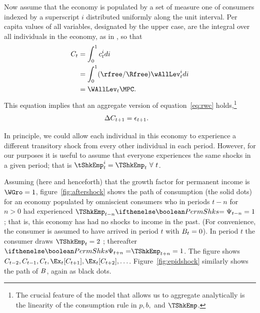 \documentclass{handout}
\begin{document}
Now assume that the economy is populated by a set of measure one of
consumers indexed by a superscript $i$ distributed uniformly along the unit
interval.  Per capita values of all variables, designated by the upper
case, are the integral over all individuals in the economy, 
as in \Aggregation, so that 
\begin{equation}\begin{gathered}\begin{aligned}
        \CLev_{t}  & =  \int_{0}^{1} \cLev_{t}^{i} di
\\       & =  \int_{0}^{1} (\rfree/\Rfree)  \wAllLev_{t}^{i} di
\\   & =  \WAllLev_{t} \MPC
.
\end{aligned}\end{gathered}\end{equation}
This equation implies that an aggregate version of equation~\eqref{eq:rwc} holds,\footnote{The crucial feature of the model that allows us to aggregate 
analytically is the linearity of the consumption rule in $p, b, $ and 
$\TShkEmp$.}
  \begin{equation}\begin{gathered}\begin{aligned}
    \Delta C_{t+1} & =  \epsilon_{t+1}
.
  \end{aligned}\end{gathered}\end{equation}

In principle, we could allow each individual in this economy to experience a different transitory  shock from every other individual in each period.  However, for our purposes
it is useful to assume that everyone experiences the same shocks in a given period; that is $\tShkEmp_{t}^{i}=\TShkEmp_{t}~\forall~t$.

Assuming (here and henceforth) that the growth factor for permanent income is $\WGro=1$, figure~\ref{fig:aftershock} shows the path of consumption (the solid
dots) for an economy populated by omniscient consumers who in periods
$t-n$ for $n>0$ had experienced
$\TShkEmp_{t-n}\ifPerm{=\Psi_{t-n}}{}=1$; that is, this economy has had
no shocks to income in the past.  (For convenience, the consumer is
assumed to have arrived in period $t$ with $B_{t}=0$).  In period
$t$ the consumer draws $\TShkEmp_{t}=2$ ;
thereafter $\ifPerm{\Psi_{t+n}=}{}\TShkEmp_{t+n}=1$.  The figure shows
$\CLev_{t-2},\CLev_{t-1},\CLev_{t},\Ex_{t}[\CLev_{t+1}],\Ex_{t}[\CLev_{t+2}],\ldots$.
Figure~\ref{fig:epidshock} similarly shows the path of $B$, again
as black dots.
\end{document}

